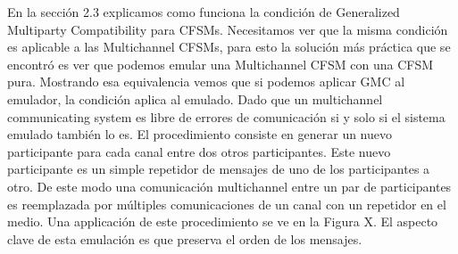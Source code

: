 \documentclass[paper=a4, fontsize=11pt, spanish]{scrartcl} %
\numberwithin{equation}{section} %
\numberwithin{figure}{section} %
\numberwithin{table}{section} %
\begin{document}
En la sección 2.3 explicamos como funciona la condición de Generalized Multiparty Compatibility para CFSMs. Necesitamos ver que la misma condición es aplicable a las Multichannel CFSMs, para esto la solución más práctica que se encontró es ver que podemos emular una Multichannel CFSM con una CFSM pura. Mostrando esa equivalencia vemos que si podemos aplicar GMC al emulador, la condición aplica al emulado. Dado que un multichannel communicating system es libre de errores de comunicación si y solo si el sistema emulado también lo es. El procedimiento consiste en generar un nuevo participante para cada canal entre dos otros participantes. Este nuevo participante es un simple repetidor de mensajes de uno de los participantes a otro. De este modo una comunicación multichannel entre un par de participantes es reemplazada por múltiples comunicaciones de un canal con un repetidor en el medio. Una applicación de este procedimiento se ve en la Figura X. El aspecto clave de esta emulación es que preserva el orden de los mensajes.
\end{document}
